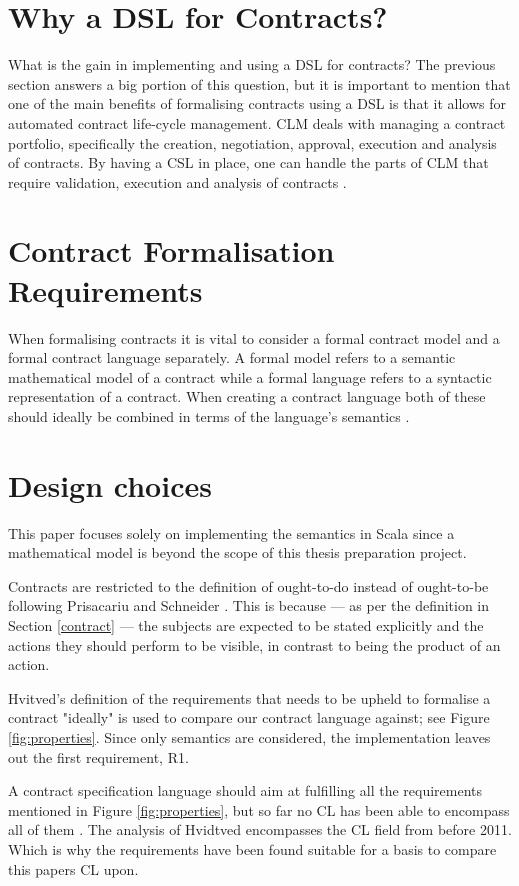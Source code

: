 \documentclass{ituthesis}
\begin{document}
\section{Why a DSL for Contracts?}
What is the gain in implementing and using a DSL for contracts? The previous section answers a big portion of this question, but it is important to mention that one of the main benefits of formalising contracts using a DSL is that it allows for automated contract life-cycle management. CLM deals with managing a contract portfolio, specifically the creation, negotiation, approval, execution and analysis of contracts. By having a CSL in place, one can handle the parts of CLM that require validation, execution and analysis of contracts \cite{hvitved2011contract}.

\section{Contract Formalisation Requirements} \label{requirements}
When formalising contracts it is vital to consider a formal contract model and a formal contract language separately. A formal model refers to a semantic mathematical model of a contract while a formal language refers to a syntactic representation of a contract. When creating a contract language both of these should ideally be combined in terms of the language's semantics \cite{hvitved2011contract}. 

\section{Design choices}
This paper focuses solely on implementing the semantics in Scala since a mathematical model is beyond the scope of this thesis preparation project.

Contracts are restricted to the definition of ought-to-do instead of ought-to-be following Prisacariu and Schneider \cite{prisacariu2007formal}. This is because --- as per the definition in Section \ref{contract} --- the subjects are expected to be stated explicitly and the actions they should perform to be visible, in contrast to being the product of an action.

Hvitved's definition of the requirements that needs to be upheld to formalise a contract "ideally" is used to compare our contract language against; see Figure \ref{fig:properties}. Since only semantics are considered, the implementation leaves out the first requirement, R1.

A contract specification language should aim at fulfilling all the requirements mentioned in Figure \ref{fig:properties}, but so far no CL has been able to encompass all of them \cite{hvitved2011contract}. The analysis of Hvidtved encompasses the CL field from before 2011. Which is why the requirements have been found suitable for a basis to compare this papers CL upon.
\end{document}
